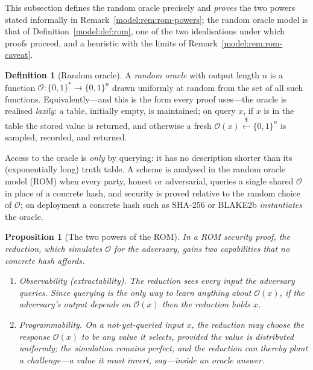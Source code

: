 \documentclass[11pt,a4paper]{article}
\newtheorem{proposition}[theorem]{Proposition}
\theoremstyle{definition}
\newtheorem{definition}[theorem]{Definition}
\theoremstyle{remark}
\begin{document}
This subsection defines the random oracle precisely and \emph{proves}
the two powers stated informally in Remark~\ref{model:rem:rom-powers};
the random oracle model is that of Definition~\ref{model:def:rom}, one
of the two idealisations under which proofs proceed, and a heuristic
with the limits of Remark~\ref{model:rem:rom-caveat}.

\begin{definition}[Random oracle]\label{hash:def:ro}
A \emph{random oracle} with output length \(n\) is a function
\(\mathcal{O} \colon \{0,1\}^{*} \to \{0,1\}^{n}\) drawn uniformly at
random from the set of all such functions. Equivalently---and this is
the form every proof uses---the oracle is realised \emph{lazily}: a
table, initially empty, is maintained; on query \(x\), if \(x\) is in
the table the stored value is returned, and otherwise a fresh
\(\mathcal{O}(x) \xleftarrow{\$} \{0,1\}^{n}\) is sampled, recorded,
and returned.
\end{definition}

Access to the oracle is \emph{only} by querying: it has no description
shorter than its (exponentially long) truth table. A scheme is
analysed in the random oracle model (ROM) when every party, honest or
adversarial, queries a single shared \(\mathcal{O}\) in place of a
concrete hash, and security is proved relative to the random choice
of \(\mathcal{O}\); on deployment a concrete hash such as SHA-256 or
BLAKE2b \emph{instantiates} the oracle.

\begin{proposition}[The two powers of the ROM]\label{hash:prop:rom-powers}
In a ROM security proof, the reduction, which simulates
\(\mathcal{O}\) for the adversary, gains two capabilities that no
concrete hash affords.
\begin{enumerate}
\item \emph{Observability (extractability).} The reduction sees every
  input the adversary queries. Since querying is the only way to learn
  anything about \(\mathcal{O}(x)\), if the adversary's output depends
  on \(\mathcal{O}(x)\) then the reduction holds \(x\).
\item \emph{Programmability.} On a not-yet-queried input \(x\), the
  reduction may choose the response \(\mathcal{O}(x)\) to be any value
  it selects, provided the value is distributed uniformly; the
  simulation remains perfect, and the reduction can thereby
  \emph{plant} a challenge---a value it must invert, say---inside an
  oracle answer.
\end{enumerate}
\end{proposition}
\end{document}
